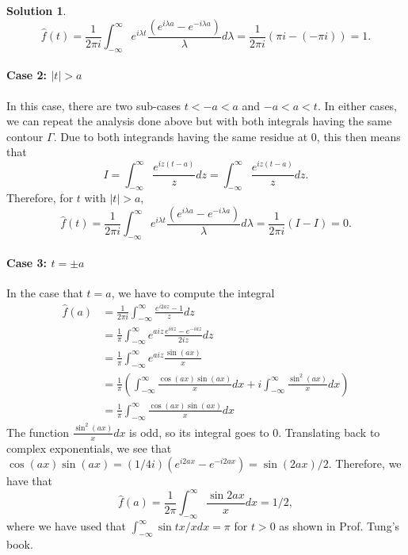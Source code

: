 \documentclass[12pt]{article}
\newcommand{\abs}[1]{ \left| #1 \right| }
\theoremstyle{definition}
\newtheorem{sol}{Solution}
\theoremstyle{remark}
\begin{document}
\begin{sol}
    \begin{equation}
       \hat f(t) = \frac{1}{2\pi i}  \int_{-\infty}^{\infty} e^{i\lambda t} \frac{(e^{i\lambda a} - e^{-i\lambda a} )}{\lambda} d\lambda = \frac{1}{2\pi i} (\pi i - (-\pi i)) = 1. 
    \end{equation}

    \paragraph{Case 2: $\abs{t} > a$}%
    \label{par:case_2_t_a_}
   In this case, there are two sub-cases $t < -a < a$ and $-a < a < t$. In either cases, we can repeat the analysis done above but with both integrals having the same contour $\Gamma$. Due to both integrands having the same residue at $0$, this then means that 
   \begin{equation}
      I =  \int_{-\infty}^{\infty} \frac{e^{i z (t-a)}}{z} dz = \int_{-\infty}^{\infty} \frac{e^{i z (t-a)}}{z} dz .
   \end{equation}
   Therefore, for $t$ with $\abs{t} > a$,
    \begin{equation}
       \hat f(t) = \frac{1}{2\pi i}  \int_{-\infty}^{\infty} e^{i\lambda t} \frac{(e^{i\lambda a} - e^{-i\lambda a} )}{\lambda} d\lambda = \frac{1}{2\pi i} (I - I) = 0. 
    \end{equation}

    \paragraph{Case 3: $t = \pm a$}%
    In the case that $t = a$, we have to compute the integral
    \begin{align}
        \hat f(a) &= \frac{1}{2\pi i} \int_{-\infty}^{\infty} \frac{e^{i2az}-1}{z} dz \\
             &= \frac{1}{\pi} \int_{-\infty}^{\infty} e^{aiz}\frac{e^{iaz}-e^{-iaz}}{2iz}dz \\
             & = \frac{1}{\pi} \int_{-\infty}^{\infty} e^{aiz} \frac{\sin (ax)}{x}\\
             &= \frac{1}{\pi}  \left(\int_{-\infty}^{\infty} \frac{\cos(ax)\sin(ax)}{x}dx +  i\int_{-\infty}^{\infty} \frac{\sin^2(ax)}{x}dx \right)\\
             &=  \frac{1}{\pi} \int_{-\infty}^{\infty} \frac{\cos(ax)\sin(ax)}{x}dx
    \end{align}
    The function $\frac{\sin^2(ax)}{x}dx$ is odd, so its integral goes to 0. Translating back to complex exponentials, we see that $\cos(ax)\sin(ax) = (1/4i) (e^{i2ax} - e^{-i2ax}) = \sin(2ax)/2$. Therefore, we have that
    \begin{equation}
    \hat f(a) = \frac{1}{2\pi} \int_{-\infty}^{\infty} \frac{\sin 2ax}{x} dx = 1/2,  
    \end{equation}
    where we have used that $\int_{-\infty}^{\infty} \sin tx / x dx = \pi$ for $t>0$ as shown in Prof. Tung's book.


\end{sol}
\end{document}
